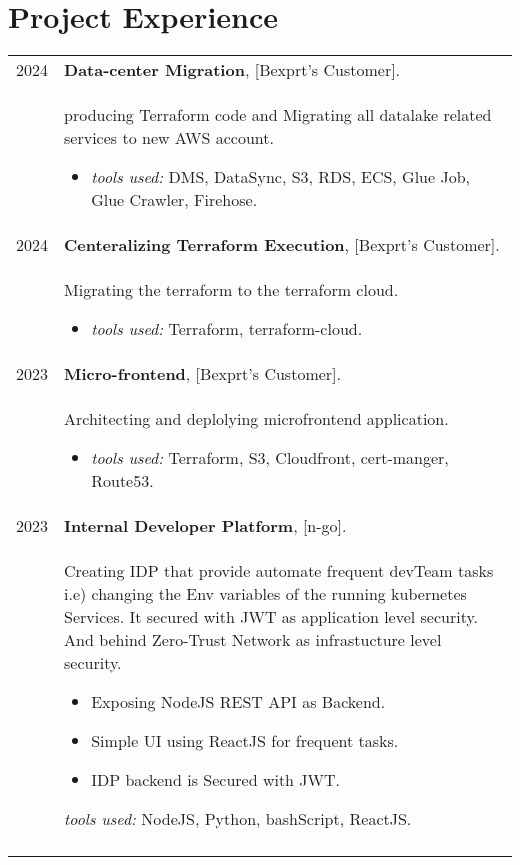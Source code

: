 \documentclass[a4paper,10pt]{article}
\begin{document}
\section{\textbf{Project Experience}}  
    \begin{longtable}{r p{16cm}}

        2024  & \textbf{Data-center Migration}, [Bexprt's Customer].\\&
        producing Terraform code and Migrating all datalake related services to new AWS account.
        \begin{itemize}
            \item \textit{tools used: } DMS, DataSync, S3, RDS, ECS, Glue Job, Glue Crawler, Firehose.
        \end{itemize}\\
   
        2024  & \textbf{Centeralizing Terraform Execution}, [Bexprt's Customer].\\&
        Migrating the terraform to the terraform cloud. 
        \begin{itemize}
            \item \textit{tools used: } Terraform, terraform-cloud.
        \end{itemize}\\
   

        2023  & \textbf{Micro-frontend}, [Bexprt's Customer].\\&
        Architecting and deplolying microfrontend application.
        \begin{itemize}
            \item \textit{tools used: } Terraform, S3, Cloudfront, cert-manger, Route53.
        \end{itemize}\\
   

        2023  & \textbf{Internal Developer Platform}, [n-go].\\&
        Creating IDP that provide automate frequent devTeam tasks i.e) changing the Env variables of the running kubernetes Services. It secured with JWT as application level security. And behind Zero-Trust Network as infrastucture level security.
        \begin{itemize}
            \item Exposing NodeJS REST API as Backend. 
            \item Simple UI using ReactJS for frequent tasks. 
            \item IDP backend is Secured with JWT. 
        \end{itemize}
        \textit{tools used: } NodeJS, Python, bashScript, ReactJS.\\
        &\\ 


\end{longtable}
\end{document}
